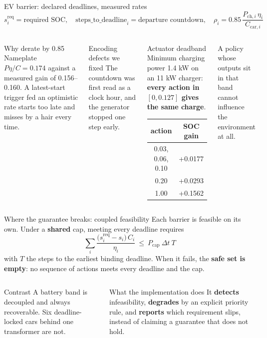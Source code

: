 \documentclass[aspectratio=169,10pt]{beamer}
\begin{document}
\begin{frame}{EV barrier: declared deadlines, measured rates}
\[
s^{\text{req}}_i = \text{required SOC},\quad
\text{steps\_to\_deadline}_i = \text{departure countdown},\quad
\rho_i = 0.85\,\frac{P_{\text{ch},i}\,\eta_i}{C_{\text{car},i}}
\]
\begin{columns}[T]
\begin{alertblock}{Why derate by 0.85}
Nameplate $P\eta/C = 0.174$ against a measured gain of 0.156--0.160. A latest-start trigger fed an optimistic rate starts too late and misses by a hair every time.
\end{alertblock}
\begin{alertblock}{Encoding defects we fixed}
The countdown was first read as a clock hour, and the generator stopped one step early.
\end{alertblock}
\begin{alertblock}{Actuator deadband}
Minimum charging power 1.4 kW on an 11 kW charger: \textbf{every action in $[0, 0.127]$ gives the same charge}.
\small
\begin{tabular}{@{}cc@{}}
\toprule
action & SOC gain \\
\midrule
0.03, 0.06, 0.10 & +0.0177 \\
0.20 & +0.0293 \\
1.00 & +0.1562 \\
\bottomrule
\end{tabular}
\end{alertblock}
\small A policy whose outputs sit in that band cannot influence the environment at all.
\end{columns}
\end{frame}

\begin{frame}{Where the guarantee breaks: coupled feasibility}
Each barrier is feasible on its own. Under a \textbf{shared} cap, meeting every deadline requires
\[
\boxed{\ \sum_i \frac{\big(s^{\text{req}}_i - s_i\big)\, C_i}{\eta_i} \ \le\ P_{\text{cap}}\ \Delta t\ T\ }
\]
with $T$ the steps to the earliest binding deadline. When it fails, the \textbf{safe set is empty}: no sequence of actions meets every deadline and the cap.
\vspace{0.4em}
\begin{columns}[T]
\begin{block}{Contrast}
A battery band is decoupled and always recoverable. Six deadline-locked cars behind one transformer are not.
\end{block}
\begin{block}{What the implementation does}
It \textbf{detects} infeasibility, \textbf{degrades} by an explicit priority rule, and \textbf{reports} which requirement slips, instead of claiming a guarantee that does not hold.
\end{block}
\end{columns}
\end{frame}
\end{document}
